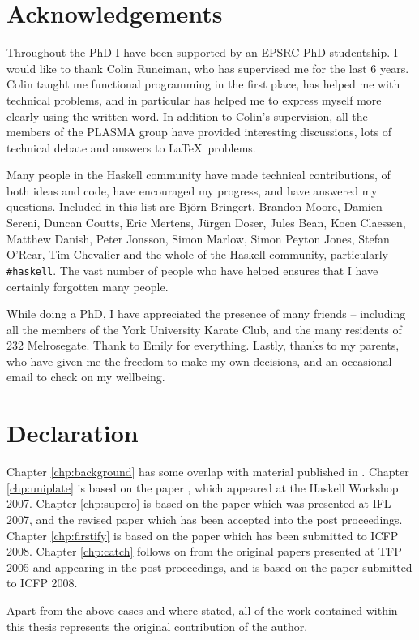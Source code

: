 \tableofcontents
\listoffigures
\listoftables

\chapter*{Acknowledgements}

Throughout the PhD I have been supported by an EPSRC PhD studentship. I would like to thank Colin Runciman, who has supervised me for the last 6 years. Colin taught me functional programming in the first place, has helped me with technical problems, and in particular has helped me to express myself more clearly using the written word. In addition to Colin's supervision, all the members of the PLASMA group have provided interesting discussions, lots of technical debate and answers to \LaTeX\ problems.

Many people in the Haskell community have made technical contributions, of both ideas and code, have encouraged my progress, and have answered my questions. Included in this list are Bj\"{o}rn Bringert, Brandon Moore, Damien Sereni, Duncan Coutts, Eric Mertens, J\"{u}rgen Doser, Jules Bean, Koen Claessen, Matthew Danish, Peter Jonsson, Simon Marlow, Simon Peyton Jones, Stefan O'Rear, Tim Chevalier and the whole of the Haskell community, particularly \verb"#haskell". The vast number of people who have helped ensures that I have certainly forgotten many people.

While doing a PhD, I have appreciated the presence of many friends -- including all the members of the York University Karate Club, and the many residents of 232 Melrosegate. Thank to Emily for everything. Lastly, thanks to my parents, who have given me the freedom to make my own decisions, and an occasional email to check on my wellbeing.

\chapter*{Declaration}

Chapter \ref{chp:background} has some overlap with material published in \cite{me:yhc_core}. Chapter \ref{chp:uniplate} is based on the paper \cite{me:uniplate}, which appeared at the Haskell Workshop 2007. Chapter \ref{chp:supero} is based on the paper \cite{me:supero_ifl} which was presented at IFL 2007, and the revised paper \cite{me:supero} which has been accepted into the post proceedings. Chapter \ref{chp:firstify} is based on the paper \cite{me:firstify_icfp} which has been submitted to ICFP 2008. Chapter \ref{chp:catch} follows on from the original papers \cite{me:catch_tfp_original,me:catch_tfp} presented at TFP 2005 and appearing in the post proceedings, and is based on the paper \cite{me:catch_icfp} submitted to ICFP 2008.

Apart from the above cases and where stated, all of the work contained within this thesis represents the original contribution of the author.
